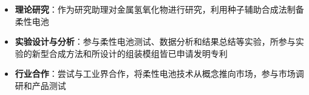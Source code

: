 

\begin{itemize}
\small 
  \item \textbf{理论研究}：作为研究助理对金属氢氧化物进行研究，利用种子辅助合成法制备柔性电池
  \item \textbf{实验设计与分析}：参与柔性电池测试、数据分析和结果总结等实验，所参与实验的新型合成方法和所设计的组装模组皆已申请发明专利
  \item \textbf{行业合作}：尝试与工业界合作，将柔性电池技术从概念推向市场，参与市场调研和产品测试
\end{itemize}

